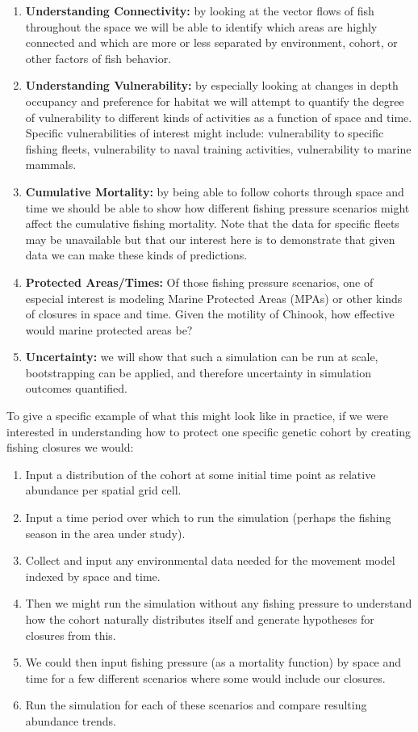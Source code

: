 \documentclass[11pt]{article}
\begin{document}
\begin{enumerate}
\item \textbf{Understanding Connectivity:} by looking at the vector flows of fish throughout the space we will be able to identify which areas are highly connected and which are more or less separated by environment, cohort, or other factors of fish behavior.
\item \textbf{Understanding Vulnerability:} by especially looking at changes in depth occupancy and preference for habitat we will attempt to quantify the degree of vulnerability to different kinds of activities as a function of space and time. Specific vulnerabilities of interest might include: vulnerability to specific fishing fleets, vulnerability to naval training activities, vulnerability to marine mammals. 
\item \textbf{Cumulative Mortality:} by being able to follow cohorts through space and time we should be able to show how different fishing pressure scenarios might affect the cumulative fishing mortality. Note that the data for specific fleets may be unavailable but that our interest here is to demonstrate that given data we can make these kinds of predictions.  
\item \textbf{Protected Areas/Times:} Of those fishing pressure scenarios, one of especial interest is modeling Marine Protected Areas (MPAs) or other kinds of closures in space and time. Given the motility of Chinook, how effective would marine protected areas be? 
\item \textbf{Uncertainty:} we will show that such a simulation can be run at scale, bootstrapping can be applied, and therefore uncertainty in simulation outcomes quantified. 
\end{enumerate}

To give a specific example of what this might look like in practice, if we were interested in understanding how to protect one specific genetic cohort by creating fishing closures we would:

\begin{enumerate}
\item Input a distribution of the cohort at some initial time point as relative abundance per spatial grid cell.
\item Input a time period over which to run the simulation (perhaps the fishing season in the area under study).
\item Collect and input any environmental data needed for the movement model indexed by space and time.
\item Then we might run the simulation without any fishing pressure to understand how the cohort naturally distributes itself and generate hypotheses for closures from this.
\item We could then input fishing pressure (as a mortality function) by space and time for a few different scenarios where some would include our closures.
\item Run the simulation for each of these scenarios and compare resulting abundance trends. 
\end{enumerate}
\end{document}
